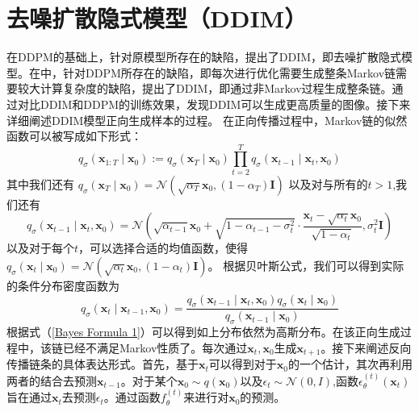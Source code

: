 \section{去噪扩散隐式模型（DDIM）}
在DDPM的基础上，针对原模型所存在的缺陷，提出了DDIM，即去噪扩散隐式模型。在\cite{DDIM}中，针对DDPM所存在的缺陷，即每次进行优化需要生成整条Markov链需要较大计算复杂度的缺陷，提出了DDIM，即通过非Markov过程生成整条链。通过对比DDIM和DDPM的训练效果，发现DDIM可以生成更高质量的图像。接下来详细阐述DDIM模型正向生成样本的过程。
在正向传播过程中，Markov链的似然函数可以被写成如下形式：
\begin{equation}
    q_\sigma\left(\boldsymbol{x}_{1: T} \mid \boldsymbol{x}_0\right):=q_\sigma\left(\boldsymbol{x}_T \mid \boldsymbol{x}_0\right) \prod_{t=2}^T q_\sigma\left(\boldsymbol{x}_{t-1} \mid \boldsymbol{x}_t, \boldsymbol{x}_0\right)
\end{equation}
其中我们还有 $q_\sigma\left(\boldsymbol{x}_T \mid \boldsymbol{x}_0\right)=\mathcal{N}\left(\sqrt{\alpha_T} \boldsymbol{x}_0,\left(1-\alpha_T\right) \boldsymbol{I}\right)$ 以及对与所有的$t>1$,我们还有
$$
q_\sigma\left(\boldsymbol{x}_{t-1} \mid \boldsymbol{x}_t, \boldsymbol{x}_0\right)=\mathcal{N}\left(\sqrt{\alpha_{t-1}} \boldsymbol{x}_0+\sqrt{1-\alpha_{t-1}-\sigma_t^2} \cdot \frac{\boldsymbol{x}_t-\sqrt{\alpha_t} \boldsymbol{x}_0}{\sqrt{1-\alpha_t}}, \sigma_t^2 \boldsymbol{I}\right)
$$
以及对于每个$t$，可以选择合适的均值函数，使得$q_\sigma\left(\boldsymbol{x}_t \mid \boldsymbol{x}_0\right)=\mathcal{N}\left(\sqrt{\alpha_t} \boldsymbol{x}_0,\left(1-\alpha_t\right) \boldsymbol{I}\right)$。
根据贝叶斯公式，我们可以得到实际的条件分布密度函数为
\begin{equation}
   q_\sigma\left(\boldsymbol{x}_t \mid \boldsymbol{x}_{t-1}, \boldsymbol{x}_0\right)=\frac{q_\sigma\left(\boldsymbol{x}_{t-1} \mid \boldsymbol{x}_t, \boldsymbol{x}_0\right) q_\sigma\left(\boldsymbol{x}_t \mid \boldsymbol{x}_0\right)}{q_\sigma\left(\boldsymbol{x}_{t-1} \mid \boldsymbol{x}_0\right)}
   \label{Bayes Formula 1}
\end{equation}
根据式（\ref{Bayes Formula 1}）可以得到如上分布依然为高斯分布。在该正向生成过程中，该链已经不满足Markov性质了。每次通过$\boldsymbol{x}_t,\boldsymbol{x}_0$生成$\boldsymbol{x}_{t+1}$。接下来阐述反向传播链条的具体表达形式。首先，基于$\boldsymbol{x}_t$可以得到对于$\boldsymbol{x}_0$的一个估计，其次再利用两者的结合去预测$\boldsymbol{x}_{t-1}$。对于某个$\boldsymbol{x}_0\sim q(\boldsymbol{x}_0)$以及$\epsilon_t \sim \mathcal{N}(0,I)$,函数$\epsilon_{\theta}^{(t)}(\boldsymbol{x}_t)$旨在通过$\boldsymbol{x}_t$去预测$\epsilon_t$。通过函数$f^{(t)}_{\theta}$来进行对$\boldsymbol{x}_0$的预测。
